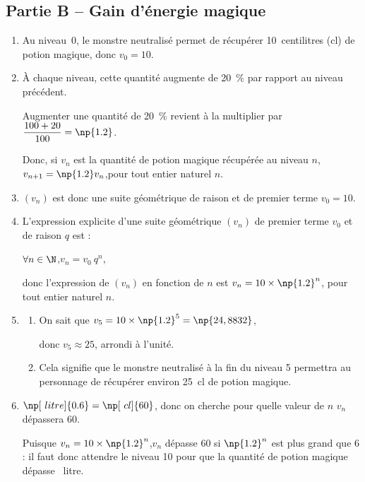 \subsection*{Partie B -- Gain d'énergie magique}
\begin{enumerate}
	\item Au niveau~0, le monstre neutralisé permet de récupérer 10~centilitres (cl) de potion magique, donc $v_0 = 10$.

	\item À chaque niveau, cette quantité augmente de 20~\% par rapport au niveau précédent.

	Augmenter une quantité de 20~\% revient à la multiplier par $\dfrac{100+20}{100} = \np{1.2}$.

	Donc, si $v_n$ est la quantité de potion magique récupérée au niveau $n$, \quad $v_{n+1} = \np{1.2} v_n$,\quad pour tout entier naturel $n$.

	\item $(v_n)$ est donc une suite géométrique de raison  et de premier terme $v_0 = 10$.

	\item L'expression explicite d'une suite géométrique $(v_n)$ de premier terme $v_0$ et de raison $q$ est :

	$\forall n \in \N$,\quad $v_n = v_0~q^n$,

	donc l'expression de $(v_n)$ en fonction de $n$ est $ v_n = 10 \times \np{1.2}^n$, pour tout entier naturel $n$.

	\item \begin{enumerate}
		\item On sait que \quad $v_5 = 10\times \np{1.2}^5 = \np{24,8832}$,

		donc $v_5\approx25$, arrondi à l'unité.

		\item Cela signifie que le monstre neutralisé à la fin du niveau 5 permettra au personnage de récupérer environ 25~cl de potion magique.
	\end{enumerate}

	\item $\np[~litre]{0.6} = \np[~cl]{60}$, donc on cherche pour quelle valeur de $n$ $v_n$ dépassera 60.

	Puisque $ v_n = 10 \times \np{1.2}^n$,\quad $v_n$ dépasse 60 si $\np{1.2}^n$ est plus grand que 6 : il faut donc attendre le niveau 10 pour que la quantité de potion magique dépasse ~litre.
\end{enumerate}

